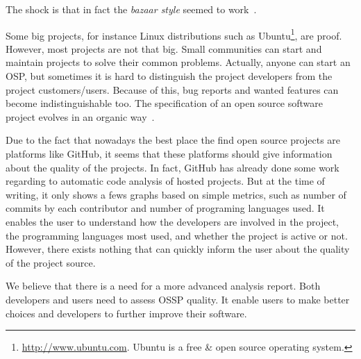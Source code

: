 The shock is that in fact the \textit{bazaar style} seemed to work~\cite{halloran2002high}.


Some big projects, for instance Linux distributions such as 
\textsf{Ubuntu}\footnote{\url{http://www.ubuntu.com}. Ubuntu is a free \& open source operating system.},
are proof.
However, most projects are not that big. 
Small communities can start and maintain projects to solve their common problems.
Actually, anyone can start an OSP, but
sometimes it is hard to distinguish the project developers from the project customers/users.
Because of this, bug reports and wanted features can become indistinguishable too.
The specification of an open source software project evolves in an organic way~\cite{capiluppicathedral}.

Due to the fact that nowadays the best place the find open source projects are platforms like GitHub, 
it seems that these platforms should give information about the quality of the projects. 
In fact, GitHub has already done some work regarding to automatic code analysis of hosted projects.
But at the time of writing, it only shows a fews graphs based on simple metrics, 
such as number of commits by each contributor and number of programing languages used.
It enables the user to understand how the developers are involved in the project,
the programming languages most used, and whether the project is active or not.
However, there exists nothing that can quickly inform the user about the quality of the project source.

We believe that there is a need for a more advanced analysis report.
Both developers and users need to assess OSSP quality. It enable users to make better choices and developers to further improve their software.
 
